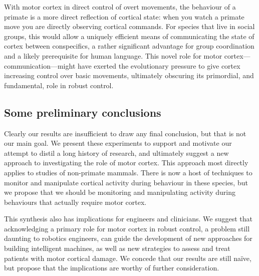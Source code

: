 With motor cortex in direct control of overt movements, the behaviour of a primate is a more direct reflection of cortical state: when you watch a primate move you are directly observing cortical commands. For species that live in social groups, this would allow a uniquely efficient means of communicating the state of cortex between conspecifics, a rather significant advantage for group coordination and a likely prerequisite for human language. This novel role for motor cortex---communication---might have exerted the evolutionary pressure to give cortex increasing control over basic movements, ultimately obscuring its primordial, and fundamental, role in robust control.

\subsection{Some preliminary conclusions}

Clearly our results are insufficient to draw any final conclusion, but that is not our main goal. We present these experiments to support and motivate our attempt to distil a long history of research, and ultimately suggest a new approach to investigating the role of motor cortex. This approach most directly applies to studies of non-primate mammals. There is now a host of techniques to monitor and manipulate cortical activity during behaviour in these species, but we propose that we should be monitoring and manipulating activity during behaviours that actually require motor cortex.

This synthesis also has implications for engineers and clinicians. We suggest that acknowledging a primary role for motor cortex in robust control, a problem still daunting to robotics engineers, can guide the development of new approaches for building intelligent machines, as well as new strategies to assess and treat patients with motor cortical damage. We concede that our results are still naïve, but propose that the implications are worthy of further consideration.

